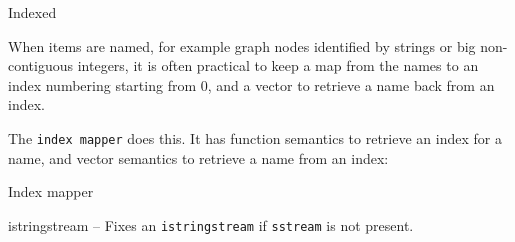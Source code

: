 \categorycontents{}

\begin{algorithm}{Indexed}
\end{algorithm}

When items are named, for example graph nodes identified by strings or big
non-contiguous integers, it is often practical to keep a map from the
names to an index numbering starting from 0, and a vector to retrieve a name
back from an index.

The {\tt index mapper} does this.
It has function semantics to retrieve an index for a name,
and vector semantics to retrieve a name from an index:
\begin{algorithm}{Index mapper}
\end{algorithm}

\begin{algorithm}{istringstream}
-- Fixes an {\tt istringstream} if {\tt sstream} is not present.
\end{algorithm}

\begin{sourceslandscape}
\end{sourceslandscape}
